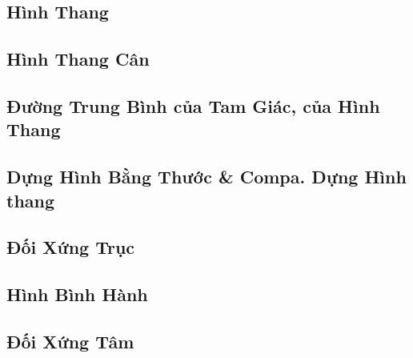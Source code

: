 \documentclass{article}
\numberwithin{equation}{section}
\begin{document}

\subsection{Hình Thang}


\subsection{Hình Thang Cân}


\subsection{Đường Trung Bình của Tam Giác, của Hình Thang}


\subsection{Dựng Hình Bằng Thước \& Compa. Dựng Hình thang}


\subsection{Đối Xứng Trục}


\subsection{Hình Bình Hành}


\subsection{Đối Xứng Tâm}

\end{document}
